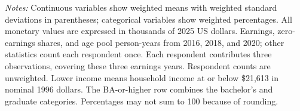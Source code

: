 \begin{table}[!htbp]
\begin{minipage}{\linewidth}
\footnotesize\singlespacing
\textit{Notes:} Continuous variables show weighted means with weighted standard
deviations in parentheses; categorical variables show weighted percentages.
All monetary values are expressed in
thousands of 2025 US dollars. Earnings, zero-earnings shares, and age pool
person-years from 2016, 2018, and 2020; other statistics count each respondent once.
Each respondent contributes three observations, covering these three earnings years.
Respondent counts are unweighted. Lower income means household income at or below \$21,613
in nominal 1996 dollars. The BA-or-higher row combines the bachelor's and graduate
categories. Percentages may not sum to 100 because of rounding.
\end{minipage}
\end{table}
